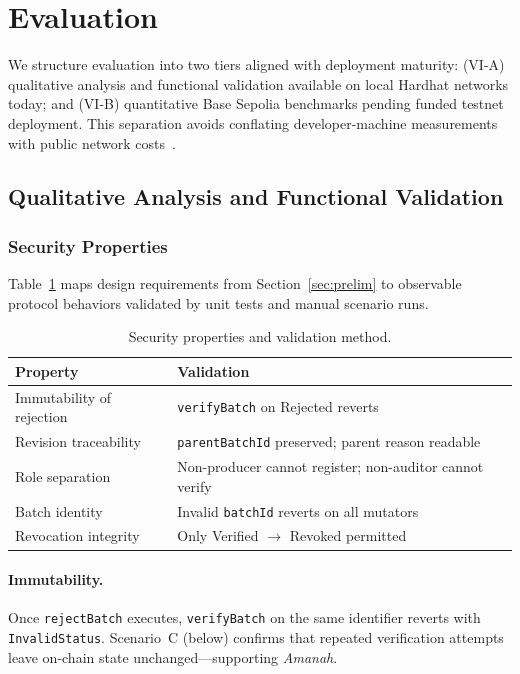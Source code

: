 \section{Evaluation}
\label{sec:eval}

We structure evaluation into two tiers aligned with deployment maturity: (VI-A) qualitative analysis and functional validation available on local Hardhat networks today; and (VI-B) quantitative Base Sepolia benchmarks pending funded testnet deployment.
This separation avoids conflating developer-machine measurements with public network costs~\cite{casino2021systematic}.

\subsection{Qualitative Analysis and Functional Validation}
\label{sec:eval-a}

\subsubsection{Security Properties}
Table~\ref{tab:security} maps design requirements from Section~\ref{sec:prelim} to observable protocol behaviors validated by unit tests and manual scenario runs.

\begin{table}[t]
  \caption{Security properties and validation method.}
  \label{tab:security}
  \centering
  \footnotesize
  \setlength{\tabcolsep}{3pt}
  \begin{tabularx}{\columnwidth}{@{}>{\raggedright\arraybackslash}p{}X@{}}
    \toprule
    \textbf{Property} & \textbf{Validation} \\
    \midrule
    Immutability of rejection & \texttt{verifyBatch} on Rejected reverts \\
    Revision traceability & \texttt{parentBatchId} preserved; parent reason readable \\
    Role separation & Non-producer cannot register; non-auditor cannot verify \\
    Batch identity & Invalid \texttt{batchId} reverts on all mutators \\
    Revocation integrity & Only Verified $\rightarrow$ Revoked permitted \\
    \bottomrule
  \end{tabularx}
\end{table}

\paragraph{Immutability.}
Once \texttt{rejectBatch} executes, \texttt{verifyBatch} on the same identifier reverts with \texttt{InvalidStatus}.
Scenario~C (below) confirms that repeated verification attempts leave on-chain state unchanged---supporting \emph{Amanah}.

